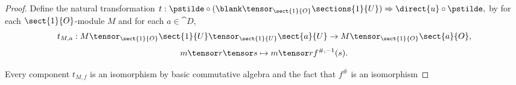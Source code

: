 
\begin{proof}
Define the natural transformation
$t: \pstilde \circ (\blank \tensor_{\sect{1}{O}} \sections{1}{U}) \Rightarrow \direct{u} \circ \pstilde,$
by 
for each $\sect{1}{O}$-module $M$
and for each $a \in \cat{D}$,
\[t_{M,a}: M \tensor_{\sect{1}{O}} \sect{1}{U} \tensor_{\sect{1}{U}} \sect{a}{U}  
	\rightarrow  M \tensor_{\sect{1}{O}} \sect{a}{O} ,\]
\[m\tensor r \tensor s \mapsto m \tensor rf^{\#,-1}(s).\]

Every component $t_{M,f}$ is an isomorphism by basic commutative algebra and 
the fact that $f^{\#}$ is an isomorphism
\end{proof}